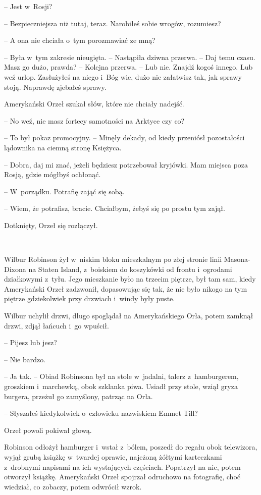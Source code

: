 \documentclass[oneside,polish,11pt,sfheadings]{mwbk}
\begin{document}
-- Jest w~Rosji?

-- Bezpieczniejsza niż tutaj, teraz. Narobiłeś sobie wrogów, rozumiesz?

-- A ona nie chciała o~tym porozmawiać ze mną?

-- Była w~tym zakresie nieugięta. -- Nastąpiła dziwna przerwa. -- Daj temu
czasu. Masz go dużo, prawda? -- Kolejna przerwa. -- Lub nie. Znajdź kogoś
innego. Lub weź urlop. Zasłużyłeś na niego i~Bóg wie, dużo nie załatwisz
tak, jak sprawy stoją. Naprawdę zjebałeś sprawy.

Amerykański Orzeł szukał słów, które nie chciały nadejść.

-- No weź, nie masz fortecy samotności na Arktyce czy co?

-- To był pokaz promocyjny. -- Minęły dekady, od kiedy przeniósł
pozostałości lądownika na ciemną stronę Księżyca.

-- Dobra, daj mi znać, jeżeli będziesz potrzebował kryjówki. Mam miejsca
poza Rosją, gdzie mógłbyś ochłonąć.

-- W~porządku. Potrafię zająć się sobą.

-- Wiem, że potrafisz, bracie. Chciałbym, żebyś się po prostu tym zajął.

Dotknięty, Orzeł się rozłączył.

~

Wilbur Robinson żył w~niskim bloku mieszkalnym po złej stronie linii
Masona-Dixona na Staten Island, z~boiskiem do koszykówki od frontu i~ogrodami działkowymi z~tyłu. Jego mieszkanie było na trzecim piętrze,
był tam sam, kiedy Amerykański Orzeł zadzwonił, dopasowując się tak, że
nie było nikogo na tym piętrze gdziekolwiek przy drzwiach i~windy były
puste.

Wilbur uchylił drzwi, długo spoglądał na Amerykańskiego Orła, potem
zamknął drzwi, zdjął łańcuch i~go wpuścił.

-- Pijesz lub jesz?

-- Nie bardzo.

-- Ja tak. -- Obiad Robinsona był na stole w~jadalni, talerz z~hamburgerem, groszkiem i~marchewką, obok szklanka piwa. Usiadł przy
stole, wziął gryza burgera, przeżuł go zamyślony, patrząc na Orła.

-- Słyszałeś kiedykolwiek o~człowieku nazwiskiem Emmet Till?

Orzeł powoli pokiwał głową.

Robinson odłożył hamburger i~wstał z~bólem, poszedł do regału obok
telewizora, wyjął grubą książkę w~twardej oprawie, najeżoną żółtymi
karteczkami z~drobnymi napisami na ich wystających częściach. Popatrzył
na nie, potem otworzył książkę. Amerykański Orzeł spojrzał odruchowo na
fotografię, choć wiedział, co zobaczy, potem odwrócił wzrok.
\end{document}
